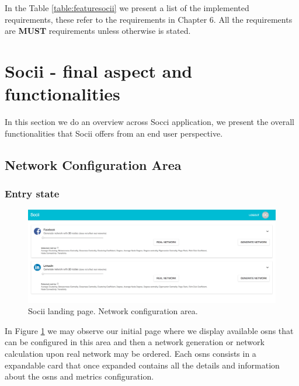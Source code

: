 In the Table \ref{table:featuresocii} we present a list of the implemented requirements, these refer to the requirements in Chapter 6. All the requirements are \textbf{MUST} requirements unless otherwise is stated.


\section{Socii - final aspect and functionalities}
In this section we do an overview across Socci application, we present the overall functionalities that Socii offers
from an end user perspective.

\subsection{Network Configuration Area}

\subsubsection*{Entry state}

\begin{figure}[h!]
\begin{center}
  \hspace*{-0.8in}
  \includegraphics[width=1.2\textwidth]{img/socii/socii_1.png}
\end{center}
\caption{\label{img:socii_1} Socii landing page. Network configuration area.}
\end{figure}

In Figure \ref{img:socii_1} we may observe our initial page where we display available \glspl{osn} that can be configured in this area and then a network generation or network calculation upon real network may be ordered. Each \glspl{osn} consists in a expandable card that once expanded contains all the details and information about the \glspl{osn} and metrics configuration.


